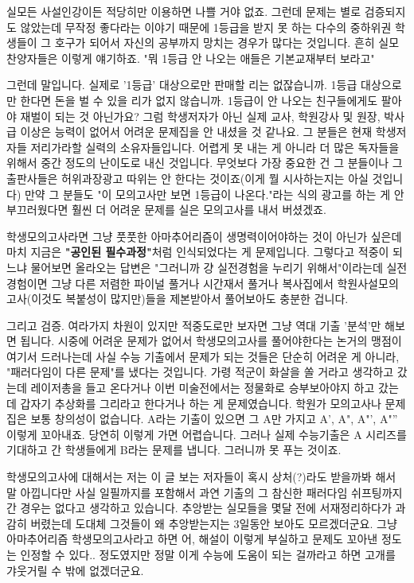 실모든 사설인강이든 적당히만 이용하면 나쁠 거야 없죠.
그런데 문제는 별로 검증되지도 않았는데 무작정 좋다라는 이야기 때문에
1등급을 받지 못 하는 다수의 중하위권 학생들이 그 호구가 되어서 자신의 공부까지 망치는 경우가 많다는 것입니다.
흔히 실모찬양자들은 이렇게 얘기하죠. "뭐 1등급 안 나오는 애들은 기본교재부터 보라고"
\vspace{5mm}

그런데 말입니다. 실제로 '1등급' 대상으로만 판매할 리는 없잖습니까.
1등급 대상으로만 한다면 돈을 벌 수 있을 리가 없지 않습니까. 1등급이 안 나오는 친구들에게도 팔아야 재벌이 되는 것 아닌가요?
그럼 학생저자가 아닌 실제 교사, 학원강사 및 원장, 박사급 이상은 능력이 없어서 어려운 문제집을 안 내셨을 것 같나요.
그 분들은 현재 학생저자들 저리가라할 실력의 소유자들입니다.
어렵게 못 내는 게 아니라 더 많은 독자들을 위해서 중간 정도의 난이도로 내신 것입니다.
무엇보다 가장 중요한 건 그 분들이나 그 출판사들은 허위과장광고 따위는 안 한다는 것이죠(이게 뭘 시사하는지는 아실 것입니다)
만약 그 분들도 "이 모의고사만 보면 1등급이 나온다."라는 식의 광고를 하는 게 안 부끄러웠다면
훨씬 더 어려운 문제를 실은 모의고사를 내서 버셨겠죠.
\vspace{5mm}

학생모의고사라면 그냥 풋풋한 아마추어리즘이 생명력이어야하는 것이 아닌가 싶은데
마치 지금은 \textbf{"공인된 필수과정"}처럼 인식되었다는 게 문제입니다.
그렇다고 적중이 되느냐 물어보면 올라오는 답변은 "그러니까 걍 실전경험을 누리기 위해서"이라는데
실전경험이면 그냥 다른 저렴한 파이널 풀거나 시간재서 풀거나 복사집에서 학원사설모의고사(이것도 복붙성이 많지만)들을
제본받아서 풀어보아도 충분한 겁니다.
\vspace{5mm}

그리고  검증.
여라가지 차원이 있지만 적중도로만 보자면 그냥 역대 기출 '분석'만 해보면 됩니다.
시중에 어려운 문제가 없어서 학생모의고사를 풀어야한다는 논거의 맹점이 여기서 드러나는데
사실 수능 기출에서 문제가 되는 것들은 단순히 어려운 게 아니라, "패러다임이 다른 문제"를 냈다는 것입니다.
가령 적군이 화살을 쏠 거라고 생각하고 갔는데 레이저총을 들고 온다거나
이번 미술전에서는 정물화로 승부보아야지 하고 갔는데 갑자기 추상화를 그리라고 한다거나 하는 게 문제였습니다.
학원가 모의고사나 문제집은 보통 창의성이 없습니다.
A라는 기출이 있으면 그 A만 가지고 A', A", A"', A"'' 이렇게 꼬아내죠. 당연히 이렇게 가면 어렵습니다.
그러나 실제 수능기출은 A 시리즈를 기대하고 간 학생들에게 B라는 문제를 냅니다. 그러니까 못 푸는 것이죠.
\vspace{5mm}

학생모의고사에 대해서는 저는 이 글 보는 저자들이 혹시 상처(?)라도 받을까봐 해서 말 아낍니다만
사실 일필까지를 포함해서 과연 기출의 그 참신한 패러다임 쉬프팅까지 간 경우는 없다고 생각하고 있습니다.
추앙받는 실모들을 몇달 전에 서재정리하다가 과감히 버렸는데 도대체 그것들이 왜 추앙받는지는 3일동안 보아도 모르겠더군요.
그냥 아마추어리즘 학생모의고사라고 하면 어, 해설이 이렇게 부실하고 문제도 꼬아낸 정도는 인정할 수 있다.. 정도였지만
정말 이게 수능에 도움이 되는 걸까라고 하면 고개를 갸웃거릴 수 밖에 없겠더군요.
\vspace{5mm}


